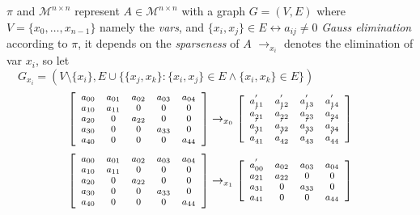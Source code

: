 \documentclass{beamer}
\begin{document}
\begin{frame}{$\pi$ and $\mathcal{M}^{n\times n}$}
represent $A\in\mathcal{M}^{n\times n}$ with a graph $G=(V, E)$
where $V= \lbrace x_{0}, \ldots, x_{n-1} \rbrace$ namely the \textit{vars}, and $
\lbrace x_{i}, x_{j} \rbrace\in E \leftrightarrow a_{ij} \neq 0$
\vfill
\textit{Gauss elimination} according to $\pi$, it depends on the
\emph{sparseness} of $A$
\vfill
$\rightarrow_{x_{i}}$ denotes the elimination of var $x_{i}$, so let \\
$\quad G_{x_{i}}=(V\setminus  \lbrace x_{i}
\rbrace, E \cup \lbrace   \lbrace x_{j}, x_{k} \rbrace : \lbrace x_{i}, x_{j}
\rbrace \in E \wedge \lbrace x_{i}, x_{k} \rbrace\in E\rbrace)$
\begin{displaymath}
\footnotesize
\left[
\begin{array}{ccccc}
a_{00} & a_{01}& a_{02}& a_{03}& a_{04}\\
a_{10} & a_{11}& 0 & 0 & 0 \\
a_{20} & 0 & a_{22}& 0 & 0 \\
a_{30} & 0 & 0 & a_{33}& 0 \\
a_{40} & 0 & 0 & 0 & a_{44}\\
\end{array}\right] \rightarrow_{x_{0}}
\left[\begin{array}{cccc}
a_{11}^{'} & a_{12}^{'}& a_{13}^{'}& a_{14}^{'}\\
a_{21}^{'} & a_{22}^{'}& a_{23}^{'}& a_{24}^{'}\\
a_{31}^{'} & a_{32}^{'}& a_{33}^{'}& a_{34}^{'}\\
a_{41}^{'} & a_{42}^{'}& a_{43}^{'}& a_{44}^{'}\\
\end{array}\right]
\end{displaymath}
\begin{displaymath}
\footnotesize
\left[
\begin{array}{ccccc}
a_{00} & a_{01}& a_{02}& a_{03}& a_{04}\\
a_{10} & a_{11}& 0 & 0 & 0 \\
a_{20} & 0 & a_{22}& 0 & 0 \\
a_{30} & 0 & 0 & a_{33}& 0 \\
a_{40} & 0 & 0 & 0 & a_{44}\\
\end{array}\right] \rightarrow_{x_{1}}
\left[\begin{array}{cccc}
a_{00}^{'} & a_{02}& a_{03}& a_{04}\\
a_{21} & a_{22}& 0 & 0 \\
a_{31} & 0 & a_{33}& 0 \\
a_{41} & 0 & 0 & a_{44}\\
\end{array}\right]
\end{displaymath}
\end{frame}
\end{document}
